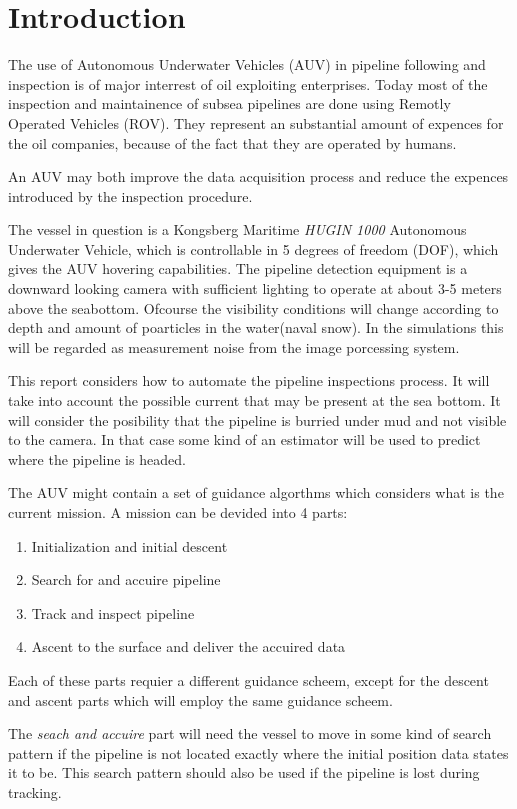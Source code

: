 \chapter{Introduction}

	The use of Autonomous Underwater Vehicles (AUV) in pipeline following and inspection is of major interrest of oil exploiting enterprises. Today most of the inspection and maintainence of subsea pipelines are done using Remotly Operated Vehicles (ROV). They represent an substantial amount of expences for the oil companies, because of the fact that they are operated by humans. 
	
	An AUV may both improve the data acquisition process and reduce the expences introduced by the inspection procedure. 
	
	The vessel in question is a Kongsberg Maritime \textit{HUGIN 1000} Autonomous Underwater Vehicle, which is controllable in 5 degrees of freedom (DOF), which gives the AUV hovering capabilities. The pipeline detection equipment is a downward looking camera with sufficient lighting to operate at about 3-5 meters above the seabottom. Ofcourse the visibility conditions will change according to depth and amount of poarticles in the water(naval snow). In the simulations this will be regarded as measurement noise from the image porcessing system. 
	
	This report considers how to automate the pipeline inspections process. It will take into account the possible current that may be present at the sea bottom. It will consider the posibility that the pipeline is burried under mud and not visible to the camera. In that case some kind of an estimator will be used to predict where the pipeline is headed.
	
	The AUV might contain a set of guidance algorthms which considers what is the current mission. A mission can be devided into 4 parts:
	\begin{enumerate}
	 \item Initialization and initial descent
	 \item Search for and accuire pipeline
	 \item Track and inspect pipeline
	 \item Ascent to the surface and deliver the accuired data
	\end{enumerate}
	Each of these parts requier a different guidance scheem, except for the descent and ascent parts which will employ the same guidance scheem. 
	
	The \textit{seach and accuire} part will need the vessel to move in some kind of search pattern if the pipeline is not located exactly where the initial position data states it to be. This search pattern should also be used if the pipeline is lost during tracking. 
	
